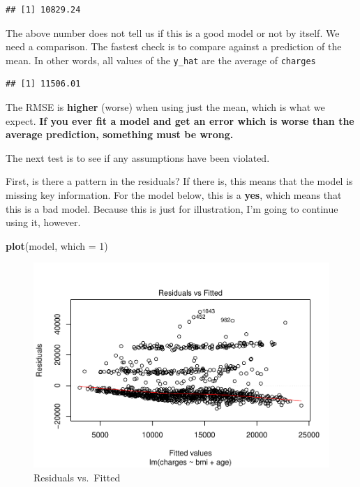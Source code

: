 \documentclass[]{book}
\newenvironment{Shaded}{\begin{snugshade}}{\end{snugshade}}
\newcommand{\DataTypeTok}[1]{\textcolor[rgb]{0.13,0.29,0.53}{#1}}
\newcommand{\DecValTok}[1]{\textcolor[rgb]{0.00,0.00,0.81}{#1}}
\newcommand{\KeywordTok}[1]{\textcolor[rgb]{0.13,0.29,0.53}{\textbf{#1}}}
\newcommand{\NormalTok}[1]{#1}
\newcommand{\OperatorTok}[1]{\textcolor[rgb]{0.81,0.36,0.00}{\textbf{#1}}}
\begin{document}
\begin{verbatim}
## [1] 10829.24
\end{verbatim}

The above number does not tell us if this is a good model or not by itself. We need a comparison. The fastest check is to compare against a prediction of the mean. In other words, all values of the \texttt{y\_hat} are the average of \texttt{charges}

\begin{Shaded}
\end{Shaded}

\begin{verbatim}
## [1] 11506.01
\end{verbatim}

The RMSE is \textbf{higher} (worse) when using just the mean, which is what we expect. \textbf{If you ever fit a model and get an error which is worse than the average prediction, something must be wrong.}

The next test is to see if any assumptions have been violated.

First, is there a pattern in the residuals? If there is, this means that the model is missing key information. For the model below, this is a \textbf{yes}, which means that this is a bad model. Because this is just for illustration, I'm going to continue using it, however.

\begin{Shaded}
\begin{Highlighting}[]
\KeywordTok{plot}\NormalTok{(model, }\DataTypeTok{which =} \DecValTok{1}\NormalTok{)}
\end{Highlighting}
\end{Shaded}

\begin{figure}
\centering
\includegraphics{Exam-PA-Study-Manual_files/figure-latex/unnamed-chunk-84-1.pdf}
\caption{\label{fig:unnamed-chunk-84}Residuals vs.~Fitted}
\end{figure}
\end{document}
